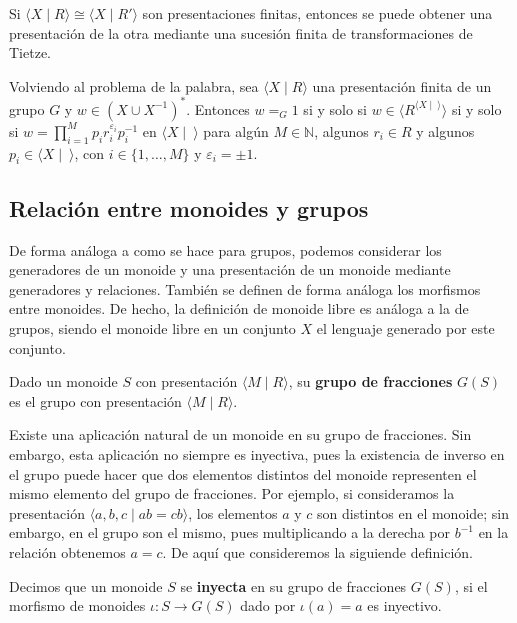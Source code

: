 \documentclass[bibtex, anon]{TEMat-article}
\providecommand{\gene}[1]{\langle{#1}\rangle}
\begin{document}
\begin{teorema}\cite[Proposición 2.1]{combinatorial}
	Si $\gene{X\mid R}\cong\gene{X\mid R'}$ son presentaciones finitas, entonces se puede obtener una presentación de la otra mediante una sucesión finita de transformaciones de Tietze.
\end{teorema}

Volviendo al problema de la palabra, sea $\gene{X\mid R}$ una presentación finita de un grupo $G$ y $w\in (X\cup X^{-1})^*$. Entonces $w=_G 1$ si y solo si $w\in \gene{R^{\gene{X\mid\ }}}$ si y solo si $w=\displaystyle\prod_{i=1}^M p_ir_i^{\varepsilon_i}p_i^{-1}$ en $\gene{X\mid\ }$ para algún $M\in\mathbb{N}$, algunos $r_i\in R$ y algunos $p_i\in\gene{X\mid\ }$, con $i\in\{1,\dots, M\}$ y $\varepsilon_i=\pm 1$. 


\subsection{Relación entre monoides y grupos}

De forma análoga a como se hace para grupos, podemos considerar los generadores de un monoide y una presentación de un monoide mediante generadores y relaciones. También se definen de forma análoga los morfismos entre monoides. De hecho, la definición de monoide libre es análoga a la de grupos, siendo el monoide libre en un conjunto $X$ el lenguaje generado por este conjunto.

\begin{definicion}
	Dado un monoide $S$ con presentación $\langle M\mid R\rangle$, su \textbf{grupo de fracciones} $G(S)$ es el grupo con presentación $\langle M\mid R\rangle$.
\end{definicion}

Existe una aplicación natural de un monoide en su grupo de fracciones. Sin embargo, esta aplicación no siempre es inyectiva, pues la existencia de inverso en el grupo puede hacer que dos elementos distintos del monoide representen el mismo elemento del grupo de fracciones. Por ejemplo, si consideramos la presentación $\langle a,b,c\mid ab=cb\rangle$, los elementos $a$ y $c$ son distintos en el monoide; sin embargo, en el grupo son el mismo, pues multiplicando a la derecha por $b^{-1}$ en la relación obtenemos $a=c$. De aquí que consideremos la siguiende definición.

\begin{definicion}
	Decimos que un monoide $S$ se \textbf{inyecta} en su grupo de fracciones $G(S)$, si el morfismo de monoides $\iota: S\to G(S)$ dado por $\iota(a)=a$ es inyectivo.
\end{definicion}
\end{document}
